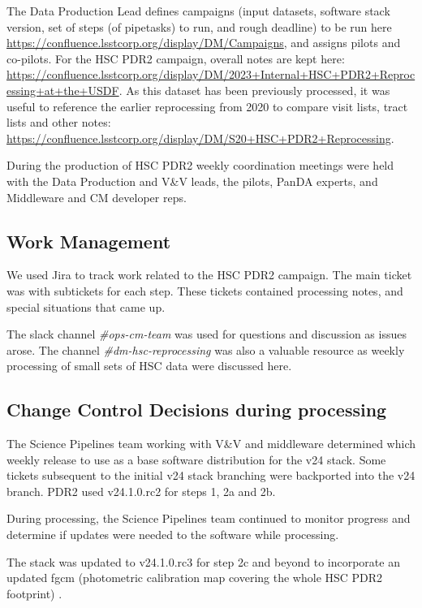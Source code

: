 The Data Production Lead defines campaigns (input datasets, software stack version, set of
steps (of pipetasks) to run, and rough deadline) to be run 
here \url{https://confluence.lsstcorp.org/display/DM/Campaigns}, and assigns pilots and co-pilots.
For the HSC PDR2 campaign, overall notes are kept here: \url{https://confluence.lsstcorp.org/display/DM/2023+Internal+HSC+PDR2+Reprocessing+at+the+USDF}.   As this dataset has been previously processed, it was useful
to reference the earlier reprocessing from 2020 to compare visit lists, tract lists and other notes:
\url{https://confluence.lsstcorp.org/display/DM/S20+HSC+PDR2+Reprocessing}.

During the production of HSC PDR2 weekly coordination meetings were held with the Data Production 
and V\&V leads, the pilots, PanDA experts, and Middleware and CM developer reps. 

\subsection{Work Management}

We used Jira to track work related to the HSC PDR2 campaign.
The main ticket was  with subtickets for each step.
These tickets contained processing notes, and special situations that came up.

The slack channel {\it\#ops-cm-team} was used for questions and discussion as issues arose.
The channel {\it\#dm-hsc-reprocessing} was also a valuable resource as weekly processing of small
sets of HSC data were discussed here.

\subsection{Change Control Decisions during processing}

The Science Pipelines team working with V\&V and middleware determined which weekly release to use as a base
software distribution for the v24 stack.  Some tickets subsequent to the initial v24 stack branching
were backported into the v24 branch.  PDR2 used v24.1.0.rc2 for steps 1, 2a and 2b.

During processing, the Science Pipelines team continued to monitor progress and determine if updates were
needed to the software while processing.

The stack was updated to v24.1.0.rc3 for step 2c and beyond to incorporate an updated fgcm (photometric
calibration map covering the whole HSC PDR2 footprint) .

